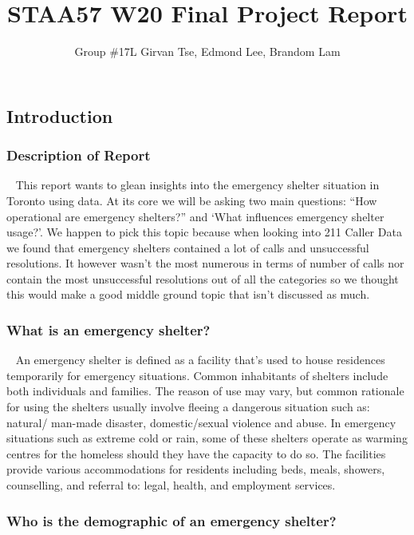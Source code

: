 \documentclass[
]{article}
\title{STAA57 W20 Final Project Report}
\author{Group \#17L Girvan Tse, Edmond Lee, Brandom Lam}
\date{}
\begin{document}
\maketitle

\hypertarget{introduction}{%
\subsection{Introduction}\label{introduction}}

\hypertarget{description-of-report}{%
\subsubsection{Description of Report}\label{description-of-report}}

~ This report wants to glean insights into the emergency shelter
situation in Toronto using data. At its core we will be asking two main
questions: ``How operational are emergency shelters?'' and `What
influences emergency shelter usage?'. We happen to pick this topic
because when looking into 211 Caller Data we found that emergency
shelters contained a lot of calls and unsuccessful resolutions. It
however wasn't the most numerous in terms of number of calls nor contain
the most unsuccessful resolutions out of all the categories so we
thought this would make a good middle ground topic that isn't discussed
as much.

\hypertarget{what-is-an-emergency-shelter}{%
\subsubsection{What is an emergency
shelter?}\label{what-is-an-emergency-shelter}}

~ An emergency shelter is defined as a facility that's used to house
residences temporarily for emergency situations. Common inhabitants of
shelters include both individuals and families. The reason of use may
vary, but common rationale for using the shelters usually involve
fleeing a dangerous situation such as: natural/ man-made disaster,
domestic/sexual violence and abuse. In emergency situations such as
extreme cold or rain, some of these shelters operate as warming centres
for the homeless should they have the capacity to do so. The facilities
provide various accommodations for residents including beds, meals,
showers, counselling, and referral to: legal, health, and employment
services.

\hypertarget{who-is-the-demographic-of-an-emergency-shelter}{%
\subsubsection{Who is the demographic of an emergency
shelter?}\label{who-is-the-demographic-of-an-emergency-shelter}}
\end{document}
